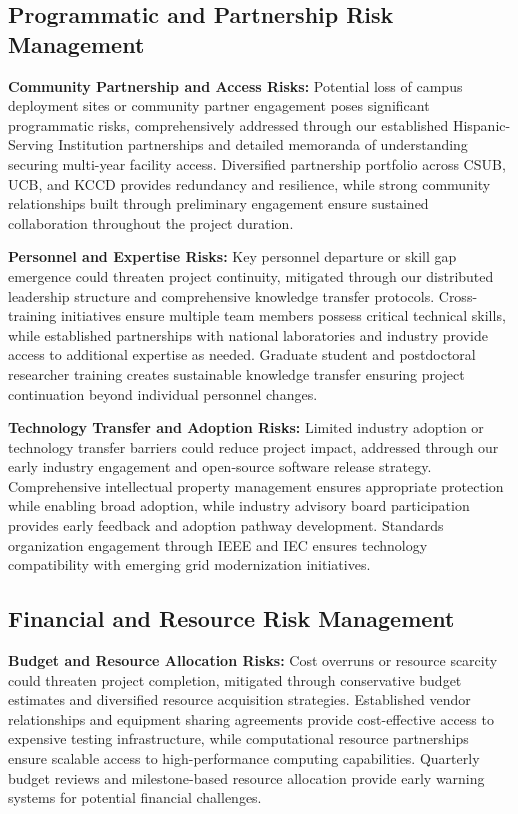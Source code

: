 \documentclass[12pt]{article}
\begin{document}
\subsection{Programmatic and Partnership Risk Management}

\textbf{Community Partnership and Access Risks:} Potential loss of campus deployment sites or community partner engagement poses significant programmatic risks, comprehensively addressed through our established Hispanic-Serving Institution partnerships and detailed memoranda of understanding securing multi-year facility access. Diversified partnership portfolio across CSUB, UCB, and KCCD provides redundancy and resilience, while strong community relationships built through preliminary engagement ensure sustained collaboration throughout the project duration.

\textbf{Personnel and Expertise Risks:} Key personnel departure or skill gap emergence could threaten project continuity, mitigated through our distributed leadership structure and comprehensive knowledge transfer protocols. Cross-training initiatives ensure multiple team members possess critical technical skills, while established partnerships with national laboratories and industry provide access to additional expertise as needed. Graduate student and postdoctoral researcher training creates sustainable knowledge transfer ensuring project continuation beyond individual personnel changes.

\textbf{Technology Transfer and Adoption Risks:} Limited industry adoption or technology transfer barriers could reduce project impact, addressed through our early industry engagement and open-source software release strategy. Comprehensive intellectual property management ensures appropriate protection while enabling broad adoption, while industry advisory board participation provides early feedback and adoption pathway development. Standards organization engagement through IEEE and IEC ensures technology compatibility with emerging grid modernization initiatives.

\subsection{Financial and Resource Risk Management}

\textbf{Budget and Resource Allocation Risks:} Cost overruns or resource scarcity could threaten project completion, mitigated through conservative budget estimates and diversified resource acquisition strategies. Established vendor relationships and equipment sharing agreements provide cost-effective access to expensive testing infrastructure, while computational resource partnerships ensure scalable access to high-performance computing capabilities. Quarterly budget reviews and milestone-based resource allocation provide early warning systems for potential financial challenges.
\end{document}
